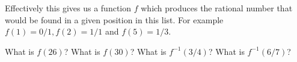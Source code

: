 \begin{enumerate}
\begin{center}

\end{center}

\workbookpagebreak

Effectively this gives us a function $f$ which produces the rational number 
that would be found in a given position in this list.  For example 
$f(1) = 0/1, f(2) = 1/1$ and $f(5) = 1/3$.  

What is $f(26)$?  What is $f(30)$?  What is $f^{-1}(3/4)$? What is $f^{-1}(6/7)$?


  
\wbvfill

\workbookpagebreak
 
\end{enumerate}


